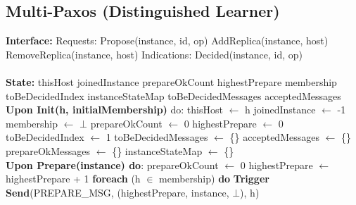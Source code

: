 \documentclass[sigconf]{acmart}
\begin{document}
\subsection{Multi-Paxos (Distinguished Learner)}
\begin{algorithmic}[1]
\small
\State \textbf{Interface:}
\State \quad Requests:
\State \quad \quad Propose(instance, id, op)
\State \quad \quad AddReplica(instance, host)
\State \quad \quad RemoveReplica(instance, host)
\State \quad Indications:
\State \quad \quad Decided(instance, id, op)\\\\

\State \textbf{State:}
\State \quad thisHost 
\State \quad joinedInstance 
\State \quad prepareOkCount 
\State \quad highestPrepare 
\State \quad membership 
\State \quad toBeDecidedIndex 
\State \quad instanceStateMap 
\State \quad toBeDecidedMessages 
\State \quad acceptedMessages  \\

\State \textbf{Upon Init(h, initialMembership)} do:
\State \quad thisHost $\gets$ h
\State \quad joinedInstance $\gets$ -1
\State \quad membership $\gets$ $\bot$
\State \quad prepareOkCount $\gets$ 0
\State \quad highestPrepare $\gets$ 0
\State \quad toBeDecidedIndex $\gets$ 1
\State \quad toBeDecidedMessages $\gets$ \{\}
\State \quad acceptedMessages $\gets$ \{\}
\State \quad prepareOkMessages $\gets$ \{\}
\State \quad instanceStateMap $\gets$ \{\} \\

\State \textbf{Upon Prepare(instance) do}:
\State \quad prepareOkCount $\gets$ 0
\State \quad highestPrepare $\gets$ highestPrepare + 1
\State \quad \textbf{foreach} (h $\in$ membership) \textbf{do}
\State \quad \quad \textbf{Trigger Send}(PREPARE\_MSG, (highestPrepare, instance, $\bot$), h) \\


\end{algorithmic}
\end{document}
